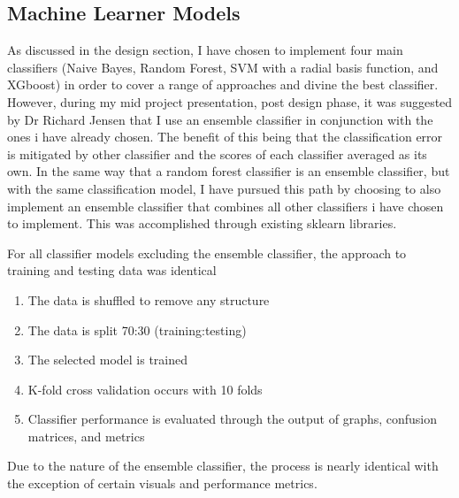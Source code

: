 \documentclass[11pt, a4paper]{article}
\begin{document}
\subsection{Machine Learner Models}
As discussed in the design section, I have chosen to implement four main classifiers (Naive Bayes, Random Forest, SVM with a radial basis function, and XGboost) in order to cover a range of approaches and divine the best classifier. However, during my mid project presentation, post design phase, it was suggested by Dr Richard Jensen that I use an ensemble classifier in conjunction with the ones i have already chosen. The benefit of this being that the classification error is mitigated by other classifier and the scores of each classifier averaged as its own. In the same way that a random forest classifier is an ensemble classifier, but with the same classification model, I have pursued this path by choosing to also implement an ensemble classifier that combines all other classifiers i have chosen to implement. This was accomplished through existing sklearn libraries.

For all classifier models excluding the ensemble classifier, the approach to training and testing data was identical 
\begin{enumerate}
\item The data is shuffled to remove any structure
\item The data is split 70:30 (training:testing)
\item The selected model is trained
\item K-fold cross validation occurs with 10 folds
\item Classifier performance is evaluated through the output of graphs, confusion matrices, and metrics
\end{enumerate}
Due to the nature of the ensemble classifier, the process is nearly identical with the exception of certain visuals and performance metrics. 
\end{document}
